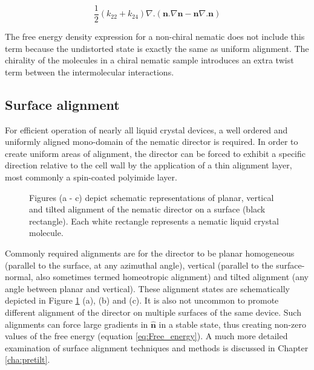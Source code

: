 \begin{equation}
\frac{1}{2}\left(k_{22}+k_{24}\right)\nabla.\left(\bm{n}.\nabla\bm{n}-\bm{n}\nabla.\bm{n}\right)
\end{equation}

The free energy density expression for a non-chiral nematic does not include this term because the undistorted state is exactly the same as uniform alignment. The chirality of the molecules in a chiral nematic sample introduces an extra twist term between the intermolecular interactions.

\subsection{Surface alignment}
For efficient operation of nearly all liquid crystal devices, a well ordered and uniformly aligned mono-domain of the nematic director is required. In order to create uniform areas of alignment, the director can be forced to exhibit a specific direction relative to the cell wall by the application of a thin alignment layer, most commonly a spin-coated polyimide layer. 

\begin{figure}
\begin{center}
\end{center}
\caption[Schematic depiction of planar, vertical and tilted alignment]{\label{fig:alignment}Figures (a - c) depict schematic representations of planar, vertical and tilted alignment of the nematic director on a surface (black rectangle). Each white rectangle represents a nematic liquid crystal molecule.}
\end{figure}

Commonly required alignments are for the director to be planar homogeneous (parallel to the surface, at any azimuthal angle), vertical (parallel to the surface-normal, also sometimes termed homeotropic alignment) and tilted alignment (any angle between planar and vertical). These alignment states are schematically depicted in Figure \ref{fig:alignment} (a), (b) and (c). It is also not uncommon to promote different alignment of the director on multiple surfaces of the same device. Such alignments can force large gradients in $\hat{\bm{n}}$ in a stable state, thus creating non-zero values of the free energy (equation \ref{eq:Free_energy}). A much more detailed examination of surface alignment techniques and methods is discussed in Chapter \ref{cha:pretilt}.

